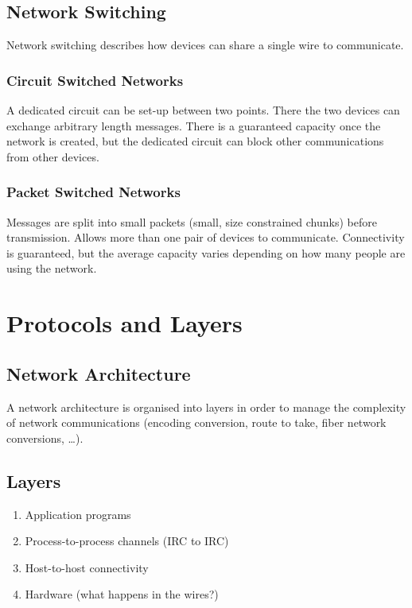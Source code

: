 \subsection{Network Switching}\label{sub:network_switching}

Network switching describes how devices can share a single wire to communicate.

\subsubsection{Circuit Switched Networks}\label{ssub:circuit_switched_networks}

A dedicated circuit can be set-up between two points.
There the two devices can exchange arbitrary length messages.
There is a guaranteed capacity once the network is created, but the dedicated circuit can block other communications from other devices.

\subsubsection{Packet Switched Networks}\label{ssub:packet_switched_networks}

Messages are split into small packets (small, size constrained chunks) before transmission.
Allows more than one pair of devices to communicate.
Connectivity is guaranteed, but the average capacity varies depending on how many people are using the network.

\section{Protocols and Layers}\label{sec:protocols_and_layers}

\subsection{Network Architecture}\label{sub:network_architecture}

A network architecture is organised into layers in order to manage the complexity of network communications (encoding conversion, route to take, fiber network conversions, \dots).

\subsection{Layers}\label{sub:layers}

\begin{enumerate}
	\item Application programs
	\item Process-to-process channels (IRC to IRC)
	\item Host-to-host connectivity
	\item Hardware (what happens in the wires?)
\end{enumerate}

